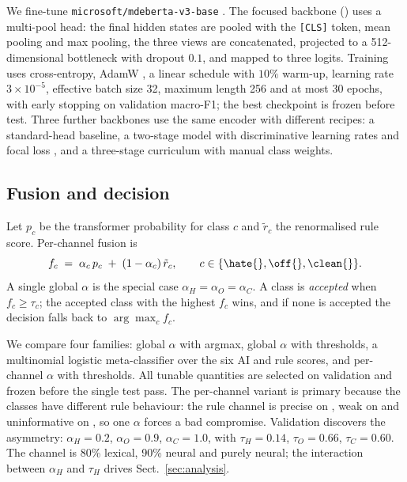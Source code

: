 We fine-tune \texttt{microsoft/mdeberta-v3-base}
\cite{he2023debertav3,liu2024mdeberta}. The focused backbone
() uses a multi-pool head: the final hidden states are
pooled with the \texttt{[CLS]} token, mean pooling and max pooling, the three views
are concatenated, projected to a 512-dimensional bottleneck with dropout $0.1$, and
mapped to three logits. Training uses cross-entropy, AdamW
\cite{loshchilov2019adamw}, a linear schedule with $10\%$ warm-up, learning rate
$3\times10^{-5}$, effective batch size 32, maximum length 256 and at most 30 epochs,
with early stopping on validation macro-F1; the best checkpoint is frozen before
test. Three further backbones use the same encoder with different recipes: a
standard-head baseline, a two-stage model with discriminative learning rates and
focal loss \cite{lin2017focal}, and a three-stage curriculum
\cite{bengio2009curriculum} with manual class weights.

\subsection{Fusion and decision}
\label{sec:fusion}

Let $p_c$ be the transformer probability for class $c$ and $\tilde r_c$ the
renormalised rule score. Per-channel fusion is
\begin{equation}
f_c \;=\; \alpha_c\,p_c \;+\; (1-\alpha_c)\,\tilde r_c,
\qquad c\in\{\hate{},\off{},\clean{}\}.
\label{eq:fusion}
\end{equation}
A single global $\alpha$ is the special case $\alpha_H=\alpha_O=\alpha_C$. A class
is \emph{accepted} when $f_c\ge\tau_c$; the accepted class with the highest $f_c$
wins, and if none is accepted the decision falls back to $\arg\max_c f_c$.

We compare four families: global $\alpha$ with argmax, global $\alpha$ with
thresholds, a multinomial logistic meta-classifier over the six AI and rule scores,
and per-channel $\alpha$ with thresholds. All tunable quantities are selected on
validation and frozen before the single test pass. The per-channel variant is
primary because the classes have different rule behaviour: the rule channel is
precise on \hate{}, weak on \off{} and uninformative on \clean{}, so one $\alpha$
forces a bad compromise. Validation discovers the asymmetry: $\alpha_H=0.2$,
$\alpha_O=0.9$, $\alpha_C=1.0$, with
$\tau_H=0.14$, $\tau_O=0.66$, $\tau_C=0.60$. The \hate{} channel is 80\% lexical,
\off{} 90\% neural and \clean{} purely neural; the interaction between
$\alpha_H$ and $\tau_H$ drives Sect.~\ref{sec:analysis}.


